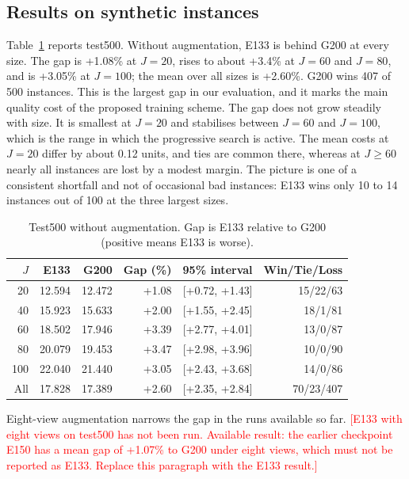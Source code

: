 \documentclass[preprint,12pt,authoryear]{elsarticle}
\newcommand{\placeholder}[1]{\textcolor{red}{[#1]}}
\begin{document}
\subsection{Results on synthetic instances}

Table~\ref{tab:test500} reports test500. Without augmentation, E133 is behind G200 at every size. The gap is +1.08\% at $J = 20$, rises to about +3.4\% at $J = 60$ and $J = 80$, and is +3.05\% at $J = 100$; the mean over all sizes is +2.60\%. G200 wins 407 of 500 instances. This is the largest gap in our evaluation, and it marks the main quality cost of the proposed training scheme. The gap does not grow steadily with size. It is smallest at $J = 20$ and stabilises between $J = 60$ and $J = 100$, which is the range in which the progressive search is active. The mean costs at $J = 20$ differ by about 0.12 units, and ties are common there, whereas at $J \ge 60$ nearly all instances are lost by a modest margin. The picture is one of a consistent shortfall and not of occasional bad instances: E133 wins only 10 to 14 instances out of 100 at the three largest sizes.

\begin{table}[t]
\centering
\caption{Test500 without augmentation. Gap is E133 relative to G200 (positive means E133 is worse).}
\label{tab:test500}
\small
\begin{tabular}{rrrrrr}
\toprule
$J$ & E133 & G200 & Gap (\%) & 95\% interval & Win/Tie/Loss \\
\midrule
20 & 12.594 & 12.472 & +1.08 & [+0.72, +1.43] & 15/22/63 \\
40 & 15.923 & 15.633 & +2.00 & [+1.55, +2.45] & 18/1/81 \\
60 & 18.502 & 17.946 & +3.39 & [+2.77, +4.01] & 13/0/87 \\
80 & 20.079 & 19.453 & +3.47 & [+2.98, +3.96] & 10/0/90 \\
100 & 22.040 & 21.440 & +3.05 & [+2.43, +3.68] & 14/0/86 \\
All & 17.828 & 17.389 & +2.60 & [+2.35, +2.84] & 70/23/407 \\
\bottomrule
\end{tabular}
\end{table}

Eight-view augmentation narrows the gap in the runs available so far. \placeholder{E133 with eight views on test500 has not been run. Available result: the earlier checkpoint E150 has a mean gap of +1.07\% to G200 under eight views, which must not be reported as E133. Replace this paragraph with the E133 result.}
\end{document}
